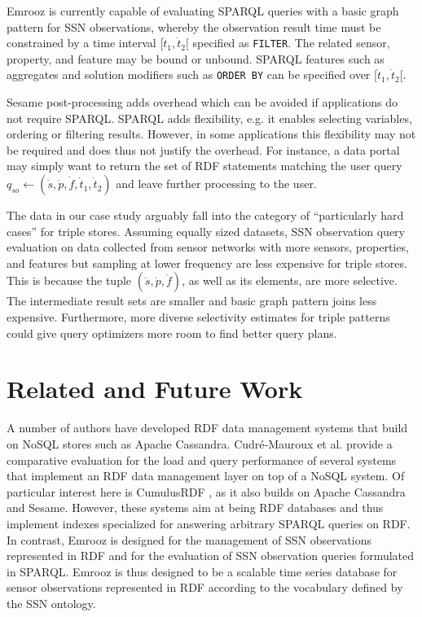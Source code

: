 \documentclass[preprint,12pt,authoryear]{elsarticle}
\begin{document}
Emrooz is currently capable of evaluating SPARQL queries with a basic graph pattern for SSN observations, whereby the observation result time must be constrained by a time interval $[\dot{t}_1,\dot{t}_2[$ specified as \texttt{FILTER}. The related sensor, property, and feature may be bound or unbound. SPARQL features such as aggregates and solution modifiers such as \texttt{ORDER BY} can be specified over $[\dot{t}_1,\dot{t}_2[$.

Sesame post-processing adds overhead which can be avoided if applications do not require SPARQL. SPARQL adds flexibility, e.g. it enables selecting variables, ordering or filtering results. However, in some applications this flexibility may not be required and does thus not justify the overhead. For instance, a data portal may simply want to return the set of RDF statements matching the user query $q_{so} \leftarrow (\dot{s},\dot{p},\dot{f},\dot{t}_1,\dot{t}_2)$ and leave further processing to the user.

The data in our case study arguably fall into the category of ``particularly hard cases'' for triple stores. Assuming equally sized datasets, SSN observation query evaluation on data collected from sensor networks with more sensors, properties, and features but sampling at lower frequency are less expensive for triple stores. This is because the tuple $(\dot{s},\dot{p},\dot{f})$, as well as its elements, are more selective. The intermediate result sets are smaller and basic graph pattern joins less expensive. Furthermore, more diverse selectivity estimates for triple patterns could give query optimizers more room to find better query plans.

\section{Related and Future Work}
\label{s:related-and-future-work}
A number of authors have developed RDF data management systems that build on NoSQL stores such as Apache Cassandra. Cudr{\'e}-Mauroux et al. \cite{harith13nosql} provide a comparative evaluation for the load and query performance of several systems that implement an RDF data management layer on top of a NoSQL system. Of particular interest here is CumulusRDF \cite{ladwig11cumulusrdf}, as it also builds on Apache Cassandra and Sesame. However, these systems aim at being RDF databases and thus implement indexes specialized for answering arbitrary SPARQL queries on RDF. In contrast, Emrooz is designed for the management of SSN observations represented in RDF and for the evaluation of SSN observation queries formulated in SPARQL. Emrooz is thus designed to be a scalable time series database for sensor observations represented in RDF according to the vocabulary defined by the SSN ontology.
\end{document}

